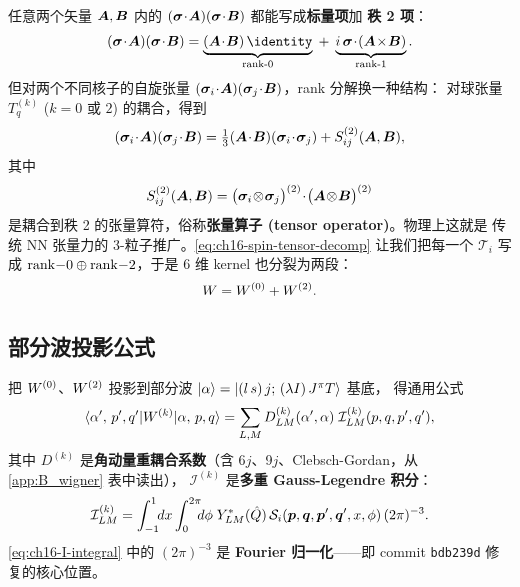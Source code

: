 任意两个矢量 \(\bm{A},\bm{B}\) 内的 \((\bm{\sigma}\!\cdot\!\bm{A})(\bm{\sigma}\!\cdot\!\bm{B})\) 都能写成\textbf{标量项}加
\textbf{秩 2 项}：
\begin{equation}
\label{eq:ch16-rank-id}
(\bvec{\sigma}\!\cdot\!\bvec{A})(\bvec{\sigma}\!\cdot\!\bvec{B})
= \underbrace{(\bvec{A}\!\cdot\!\bvec{B})\,\identity}_{\text{rank-0}}
\;+\; \underbrace{i\,\bvec{\sigma}\!\cdot\!(\bvec{A}\!\times\!\bvec{B})}_{\text{rank-1}}.
\end{equation}
但对两个不同核子的自旋张量 \((\bm{\sigma}_i\!\cdot\!\bm{A})(\bm{\sigma}_j\!\cdot\!\bm{B})\)，rank 分解换一种结构：
对球张量 \(T^{(k)}_q\) (\(k=0\) 或 \(2\)) 的耦合，得到
\begin{equation}
\label{eq:ch16-spin-tensor-decomp}
(\bvec{\sigma}_i\!\cdot\!\bvec{A})(\bvec{\sigma}_j\!\cdot\!\bvec{B})
= \tfrac{1}{3}(\bvec{A}\!\cdot\!\bvec{B})(\bvec{\sigma}_i\!\cdot\!\bvec{\sigma}_j)
+ S_{ij}^{(2)}(\bvec{A},\bvec{B}),
\end{equation}
其中
\begin{equation}
\label{eq:ch16-S2-def}
S_{ij}^{(2)}(\bm{A},\bm{B})
= \bigl(\bm{\sigma}_i\!\otimes\!\bm{\sigma}_j\bigr)^{(2)}\!\cdot\!\bigl(\bm{A}\!\otimes\!\bm{B}\bigr)^{(2)}
\end{equation}
是耦合到秩 2 的张量算符，俗称\textbf{张量算子 (tensor operator)}。物理上这就是
传统 NN 张量力的 3-粒子推广。\cref{eq:ch16-spin-tensor-decomp} 让我们把每一个 \(\mathcal{T}_i\) 写成
\(\mathrm{rank{-}0} \oplus \mathrm{rank{-}2}\)，于是 6 维 kernel 也分裂为两段：
\begin{equation}
\label{eq:ch16-W-rank}
W = W^{(0)} + W^{(2)}.
\end{equation}

\subsection{部分波投影公式}
\label{subsec:ch16-pw-formula}

把 \(W^{(0)}\)、\(W^{(2)}\) 投影到部分波 \(\ket{\alpha} = \ket{(l\,s)\,j;\,(\lambda I)\,J^\pi T}\) 基底，
得通用公式
\begin{equation}
\label{eq:ch16-W-pw}
\langle \alpha',\,p',q' | W^{(k)} | \alpha,\,p,q \rangle
= \sum_{L,M} D^{(k)}_{LM}(\alpha',\alpha)\;\mathcal{I}^{(k)}_{LM}(p,q,p',q'),
\end{equation}
其中 \(D^{(k)}\) 是\textbf{角动量重耦合系数}（含 6\(j\)、9\(j\)、Clebsch-Gordan，从 \cref{app:B_wigner} 表中读出），
\(\mathcal{I}^{(k)}\) 是\textbf{多重 Gauss-Legendre 积分}：
\begin{equation}
\label{eq:ch16-I-integral}
\mathcal{I}^{(k)}_{LM}
= \int_{-1}^{1}\!\!dx\int_{0}^{2\pi}\!\!\!d\phi
  \;Y^*_{LM}(\hat{Q})\,\mathcal{S}_i(\bm{p},\bm{q},\bm{p}',\bm{q}',x,\phi)\,(2\pi)^{-3}.
\end{equation}
\cref{eq:ch16-I-integral} 中的 \((2\pi)^{-3}\) 是 \textbf{Fourier 归一化}——即 commit
\texttt{bdb239d} 修复的核心位置。

